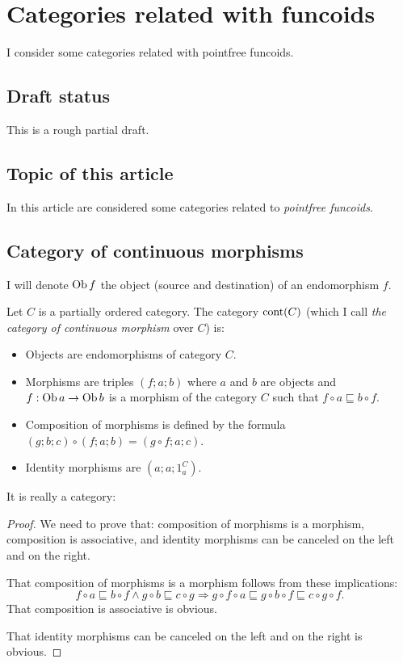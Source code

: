 \chapter{Categories related with funcoids}

I consider some categories related with pointfree funcoids.

\section{Draft status}

This is a rough partial draft.

\section{Topic of this article}

In this article are considered some categories related to \emph{pointfree
funcoids}.

\section{Category of continuous morphisms}

I will denote $\operatorname{Ob} f$ the object (source and destination) of an
endomorphism $f$.

\begin{defn}
  Let $C$ is a partially ordered category. The category
  $\operatorname{cont} (C)$ (which I call \emph{the category of
  continuous morphism} over $C$) is:
  \begin{itemize}
    \item Objects are endomorphisms of category $C$.
    
    \item Morphisms are triples $(f ; a ; b)$ where $a$ and $b$ are objects
    and $f : \operatorname{Ob} a \rightarrow \operatorname{Ob} b$ is a morphism of the
    category $C$ such that $f \circ a \sqsubseteq b \circ f$.
    
    \item Composition of morphisms is defined by the formula $(g ; b ; c)
    \circ (f ; a ; b) = (g \circ f ; a ; c)$.
    
    \item Identity morphisms are $(a ; a ; 1^C_a)$.
  \end{itemize}
\end{defn}

It is really a category:

\begin{proof}
  We need to prove that: composition of morphisms is a morphism, composition
  is associative, and identity morphisms can be canceled on the left and on
  the right.
  
  That composition of morphisms is a morphism follows from these implications:
  \[ f \circ a \sqsubseteq b \circ f \wedge g \circ b \sqsubseteq c \circ g
     \Rightarrow g \circ f \circ a \sqsubseteq g \circ b \circ f \sqsubseteq c
     \circ g \circ f. \]
  That composition is associative is obvious.
  
  That identity morphisms can be canceled on the left and on the right is
  obvious.
\end{proof}

